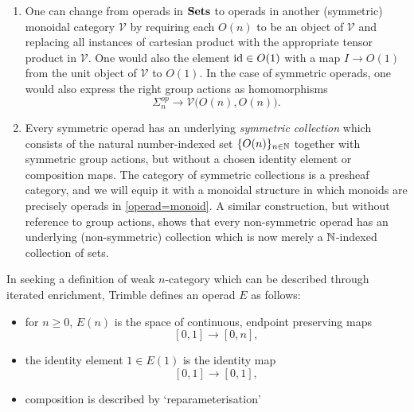 \begin{rem}\label{rem:V-and-coll}
\begin{enumerate}
\item One can change from operads in $\mathbf{Sets}$ to operads in another (symmetric) monoidal category $\mathcal{V}$ by requiring each $O(n)$ to be an object of $\mathcal{V}$ and replacing all instances of cartesian product with the appropriate tensor product in $\mathcal{V}$. One would also the element $\textrm{id} \in O(1)$ with a map $I \rightarrow O(1)$ from the unit object of $\mathcal{V}$ to $O(1)$. In the case of symmetric operads, one would also express the right group actions as homomorphisms
\[
\Sigma_n^{op} \to \mathcal{V}\big( O(n), O(n) \big).
\]
\item Every symmetric operad has an underlying \textit{symmetric collection} which consists of the natural number-indexed set $\{ O(n) \}_{n \in \mathbb{N}}$ together with symmetric group actions, but without a chosen identity element or composition maps. The category of symmetric collections is a presheaf category, and we will equip it with a monoidal structure in which monoids are precisely operads in \cref{operad=monoid}. A similar construction, but without reference to group actions, shows that every non-symmetric operad has an underlying (non-symmetric) collection which is now merely a $\mathbb{N}$-indexed collection of sets.
\end{enumerate}
\end{rem}

\begin{example}\label{ex:non-sym}
In seeking a definition of weak $n$-category which can be described through iterated enrichment, Trimble defines an operad $E$ as follows:
    \begin{itemize}
        \item for $n \geq 0$, $E(n)$ is the space of continuous, endpoint preserving maps
            \[
                [0,1] \rightarrow [0,n],
            \]
        \item the identity element $1 \in E(1)$ is the identity map
            \[
                [0,1] \rightarrow [0,1],
            \]
        \item composition is described by `reparameterisation'
    \end{itemize}
\end{example}

